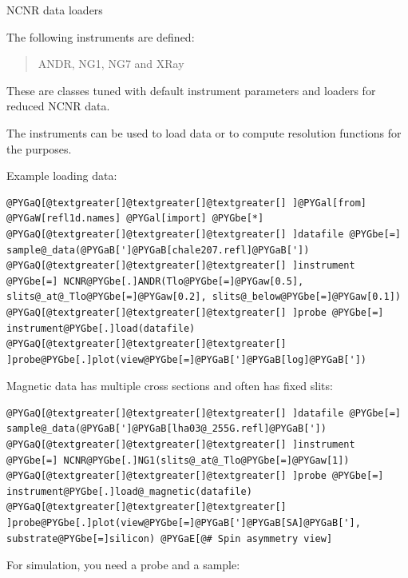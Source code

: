 \documentclass[letterpaper,10pt,english]{sphinxmanual}
\begin{document}
\label{api/ncnrdata:module-refl1d.ncnrdata}
NCNR data loaders

The following instruments are defined:
\begin{quote}

ANDR, NG1, NG7 and XRay
\end{quote}

These are {\hyperref[api/instrument:refl1d.instrument.Monochromatic]{}} classes tuned with default
instrument parameters and loaders for reduced NCNR data.

The instruments can be used to load data or to compute resolution functions
for the purposes.

Example loading data:

\begin{Verbatim}[commandchars=@\[\]]
@PYGaQ[@textgreater[]@textgreater[]@textgreater[] ]@PYGal[from] @PYGaW[refl1d.names] @PYGal[import] @PYGbe[*]
@PYGaQ[@textgreater[]@textgreater[]@textgreater[] ]datafile @PYGbe[=] sample@_data(@PYGaB[']@PYGaB[chale207.refl]@PYGaB['])
@PYGaQ[@textgreater[]@textgreater[]@textgreater[] ]instrument @PYGbe[=] NCNR@PYGbe[.]ANDR(Tlo@PYGbe[=]@PYGaw[0.5], slits@_at@_Tlo@PYGbe[=]@PYGaw[0.2], slits@_below@PYGbe[=]@PYGaw[0.1])
@PYGaQ[@textgreater[]@textgreater[]@textgreater[] ]probe @PYGbe[=] instrument@PYGbe[.]load(datafile)
@PYGaQ[@textgreater[]@textgreater[]@textgreater[] ]probe@PYGbe[.]plot(view@PYGbe[=]@PYGaB[']@PYGaB[log]@PYGaB['])
\end{Verbatim}

Magnetic data has multiple cross sections and often has fixed slits:

\begin{Verbatim}[commandchars=@\[\]]
@PYGaQ[@textgreater[]@textgreater[]@textgreater[] ]datafile @PYGbe[=] sample@_data(@PYGaB[']@PYGaB[lha03@_255G.refl]@PYGaB['])
@PYGaQ[@textgreater[]@textgreater[]@textgreater[] ]instrument @PYGbe[=] NCNR@PYGbe[.]NG1(slits@_at@_Tlo@PYGbe[=]@PYGaw[1])
@PYGaQ[@textgreater[]@textgreater[]@textgreater[] ]probe @PYGbe[=] instrument@PYGbe[.]load@_magnetic(datafile)
@PYGaQ[@textgreater[]@textgreater[]@textgreater[] ]probe@PYGbe[.]plot(view@PYGbe[=]@PYGaB[']@PYGaB[SA]@PYGaB['], substrate@PYGbe[=]silicon) @PYGaE[@# Spin asymmetry view]
\end{Verbatim}

For simulation, you need a probe and a sample:
\end{document}
